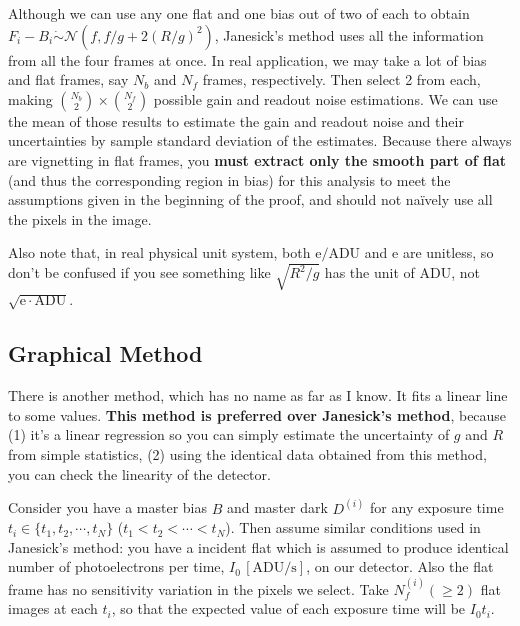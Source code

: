 Although we can use any one flat and one bias out of two of each to obtain $ F_i - B_i \mathrel{\dot{\sim}} \mathcal{N} (f, f/g + 2(R/g)^2) $, Janesick's method uses all the information from all the four frames at once. In real application, we may take a lot of bias and flat frames, say $ N_b $ and $ N_f $ frames, respectively. Then select 2 from each, making $ \binom{N_b}{2} \times \binom{N_f}{2} $ possible gain and readout noise estimations. We can use the mean of those results to estimate the gain and readout noise and their uncertainties by sample standard deviation of the estimates. Because there always are vignetting in flat frames, you \textbf{must extract only the smooth part of flat} (and thus the corresponding region in bias) for this analysis to meet the assumptions given in the beginning of the proof, and should not na\"{i}vely use all the pixels in the image.

Also note that, in real physical unit system, both $ \mathrm{e/ADU} $ and $ \mathrm{e} $ are unitless, so don't be confused if you see something like $ \sqrt{R^2/g} $ has the unit of ADU, not $ \sqrt{\mathrm{e \cdot ADU}} $.


\subsection{Graphical Method}
There is another method, which has no name as far as I know. It fits a linear line to some values. \textbf{This method is preferred over Janesick's method}, because (1) it's a linear regression so you can simply estimate the uncertainty of $ g $ and $ R $ from simple statistics, (2) using the identical data obtained from this method, you can check the linearity of the detector. 

Consider you have a master bias $ B $ and master dark $ D^{(i)} $ for any exposure time $ t_i \in \{ t_1, t_2, \cdots, t_N \} $ ($ t_1 < t_2 < \cdots < t_N $). Then assume similar conditions used in Janesick's method: you have a incident flat which is assumed to produce identical number of photoelectrons per time, $ I_0 \,\mathrm{[ADU/s]}$, on our detector. Also the flat frame has no sensitivity variation in the pixels we select. Take $ N^{(i)}_f (\ge 2) $ flat images at each $ t_i $, so that the expected value of each exposure time will be $ I_0 t_i $. 

